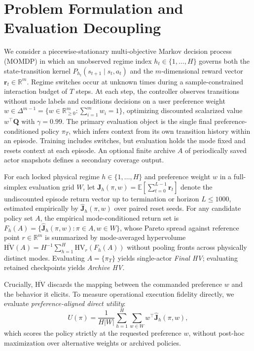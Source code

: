 \section{Problem Formulation and Evaluation Decoupling}
\label{sec:problem}
\label{sec:problem_v23}

We consider a piecewise-stationary multi-objective Markov decision process
(MOMDP) in which an unobserved regime index $h_t \in \{1,\ldots,H\}$ governs
both the state-transition kernel $P_{h_t}(s_{t+1}\mid s_t, a_t)$ and the
$m$-dimensional reward vector $\mathbf{r}_t \in \mathbb{R}^m$. Regime switches
occur at unknown times during a sample-constrained interaction budget of $T$
steps. At each step, the controller observes transitions without mode labels
and conditions decisions on a user preference weight
$w \in \Delta^{m-1} = \{w \in \mathbb{R}_{\geq 0}^m : \sum_{i=1}^m w_i = 1\}$,
optimizing discounted scalarized value $w^\top \mathbf{Q}$ with $\gamma = 0.99$.
The primary evaluation object is the single final preference-conditioned
policy $\pi_T$, which infers context from its own transition history within
an episode. Training includes switches, but evaluation holds the mode fixed
and resets context at each episode. An optional finite archive $A$ of
periodically saved actor snapshots defines a secondary coverage output.

For each locked physical regime $h \in \{1,\ldots,H\}$ and preference weight
$w$ in a full-simplex evaluation grid $W$, let
$\mathbf{J}_h(\pi, w) = \mathbb{E}[\sum_{t=0}^{L-1} \mathbf{r}_t]$ denote the
undiscounted episode return vector up to termination or horizon $L \leq 1000$,
estimated empirically by $\widehat{\mathbf{J}}_h(\pi, w)$ over paired reset
seeds. For any candidate policy set $A$, the empirical mode-conditioned return
set is $F_h(A) = \{\widehat{\mathbf{J}}_h(\pi, w) : \pi \in A, w \in W\}$,
whose Pareto spread against reference point $r \in \mathbb{R}^m$ is summarized
by mode-averaged hypervolume
$\overline{\mathrm{HV}}(A) = H^{-1}\sum_{h=1}^H \mathrm{HV}_r(F_h(A))$ without
pooling fronts across physically distinct modes. Evaluating $A = \{\pi_T\}$
yields single-actor \emph{Final HV}; evaluating retained checkpoints yields
\emph{Archive HV}.

Crucially, $\overline{\mathrm{HV}}$ discards the mapping between the commanded
preference $w$ and the behavior it elicits. To measure operational execution
fidelity directly, we evaluate \emph{preference-aligned direct utility}:
\begin{equation}
 U(\pi) = \frac{1}{H|W|}\sum_{h=1}^H \sum_{w \in W}
          w^\top \widehat{\mathbf{J}}_h(\pi, w),
 \label{eq:direct_utility}
\end{equation}
which scores the policy strictly at the requested preference $w$,
without post-hoc maximization over alternative weights or archived policies.

